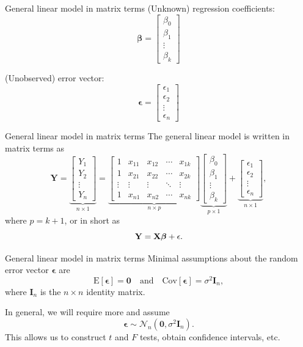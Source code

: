\documentclass{beamer}
\newcommand{\E}{\mathrm{E}}
\newcommand{\Cov}{\mathrm{Cov}}
\begin{document}
\begin{frame}{General linear model in matrix terms}
(Unknown) regression coefficients:
$$\boldsymbol\beta=\begin{bmatrix}
\beta_0\\\beta_1\\\vdots\\\beta_k
\end{bmatrix}$$

(Unobserved) error vector:
$$
\boldsymbol\epsilon=\begin{bmatrix}
\epsilon_1\\\epsilon_2\\\vdots\\\epsilon_n
\end{bmatrix}
$$
\end{frame}

\begin{frame}{General linear model in matrix terms}
The general linear model is written in matrix terms as
$$
\mathbf{Y}=\underbrace{\begin{bmatrix}
Y_1\\Y_2\\\vdots\\Y_n
\end{bmatrix}}_{n\times1}=\underbrace{\begin{bmatrix}
1 & x_{11} & x_{12} & \cdots & x_{1k}\\
1 & x_{21} & x_{22} & \cdots & x_{2k}\\
\vdots & \vdots & \vdots & \ddots & \vdots\\
1 & x_{n1} & x_{n2} & \cdots & x_{nk} 
\end{bmatrix}}_{n\times p} \underbrace{\begin{bmatrix}
\beta_0\\\beta_1\\\vdots\\\beta_k
\end{bmatrix}}_{p\times1} + \underbrace{\begin{bmatrix}
\epsilon_1\\\epsilon_2\\\vdots\\\epsilon_n
\end{bmatrix}}_{n\times1},
$$
where $p=k+1$, or in short as
$$
\mathbf{Y}=\mathbf{X}\boldsymbol{\beta}+\boldmath{\epsilon}.
$$
\end{frame}

\begin{frame}{General linear model in matrix terms}
Minimal assumptions about the random error vector $\boldsymbol\epsilon$ are
$$
\E[\boldsymbol\epsilon]=\mathbf{0}\quad\text{and}\quad\Cov[\boldsymbol\epsilon]=\sigma^2\mathbf{I}_n,
$$
where $\mathbf{I}_n$ is the $n\times n$ identity matrix.
\vspace{10pt}

\pause In general, we will require more and assume
$$
\boldsymbol\epsilon\sim\mathcal{N}_n(\mathbf{0}, \sigma^2\mathbf{I}_n).
$$
\pause This allows us to construct $t$ and $F$ tests, obtain confidence intervals, etc.

\end{frame}
\end{document}
